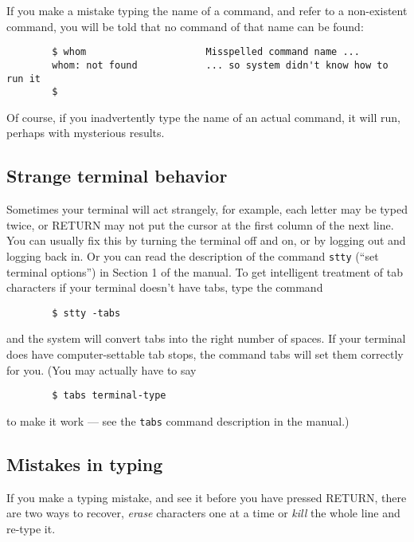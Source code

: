 If you make a mistake typing the name of a command, and refer to a non-existent
command, you will be told that no command of that name can be found:
\begin{verbatim}
        $ whom                     Misspelled command name ...
        whom: not found            ... so system didn't know how to run it
        $
\end{verbatim}
Of course, if you inadvertently type the name of an actual command, it will run,
perhaps with mysterious results.


\subsection{Strange terminal behavior}

Sometimes your terminal will act strangely, for example, each letter may be
typed twice, or RETURN may not put the cursor at the first column of the next
line. You can usually fix this by turning the terminal off and on, or by logging
out and logging back in. Or you can read the description of the command
\texttt{stty} (``set terminal options'') in Section 1 of the manual. To get
intelligent treatment of tab characters if your terminal doesn't have tabs, type
the command
\begin{verbatim}
        $ stty -tabs
\end{verbatim}
and the system will convert tabs into the right number of spaces. If your
terminal does have computer-settable tab stops, the command tabs will set them
correctly for you. (You may actually have to say
\begin{verbatim}
        $ tabs terminal-type
\end{verbatim}
to make it work --- see the \texttt{tabs} command description in the manual.)


\subsection{Mistakes in typing}
If you make a typing mistake, and see it before you have pressed RETURN, there
are two ways to recover, \textit{erase} characters one at a time or
\textit{kill} the whole line and re-type it.

